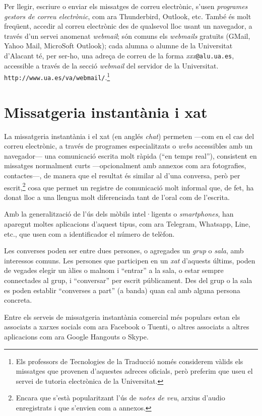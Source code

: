 Per llegir, escriure o enviar els missatges de correu electrònic,
s'usen \emph{programes gestors de correu electrònic}, com ara
Thunderbird, Outlook, etc.  També és molt freqüent, accedir al correu
electrònic des de qualsevol lloc usant un navegador, a través d'un
servei anomenat \emph{webmail}; són comuns els \emph{webmails}
gratuïts (GMail, Yahoo Mail, MicroSoft Outlook); cada alumna o alumne
de la Universitat d'Alacant té, per ser-ho, una adreça de correu de la
forma \emph{xxx}\texttt{@alu.ua.es}, accessible a través de la secció
\emph{webmail} del servidor de la Universitat.
\texttt{http://www.ua.es/va/webmail/}.\footnote{Els professors de
  Tecnologies de la Traducció només considerem vàlids els missatges
  que provenen d'aquestes adreces oficials, però preferim que useu el
  servei de tutoria electrònica de la Universitat.}

\section{Missatgeria instantània i xat}

La missatgeria instantània i el xat (en anglés \emph{chat}) permeten
---com en el cas del correu electrònic, a través de programes
especialitzats o \emph{webs} accessibles amb un navegador--- una
comunicació escrita molt ràpida (``en temps real''), consistent en
missatges normalment curts ---opcionalment amb annexos com ara
fotografies, contactes---, de manera que el resultat és similar al
d'una conversa, però per escrit,\footnote{Encara que s'està
  popularitzant l'ús de \emph{notes de veu}, arxius d'audio
  enregistrats i que s'envien com a annexos.} cosa que permet un registre
de comunicació molt informal que, de fet, ha donat lloc a una llengua molt
diferenciada tant de l'oral com de l'escrita.

Amb la generalització de l'ús dels mòbils intel·ligents o
\emph{smartphones}, han aparegut moltes aplicacions d'aquest tipus,
com ara Telegram, Whatsapp, Line, etc., que usen com a identificador
el número de telèfon. 

Les converses poden ser entre dues persones, o agregades un
\emph{grup} o \emph{sala}, amb interessos comuns.  Les persones que
participen en un \emph{xat} d'aquests últims, poden de vegades elegir
un àlies o malnom i ``entrar'' a la sala, o estar sempre connectades
al grup, i ``conversar'' per escrit públicament. Des del grup o la
sala es poden establir ``converses a part'' (a banda) quan cal amb
alguna persona concreta.

Entre els serveis de missatgeria instantània comercial més populars
estan els associats a xarxes socials com ara Facebook o Tuenti, o altres
associats a altres aplicacions com ara Google Hangouts o Skype.


